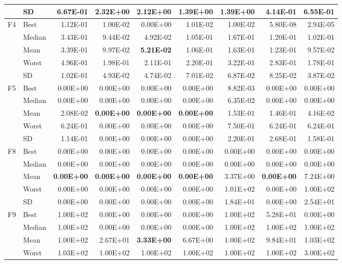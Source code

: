 \documentclass[algorithms,article,submit,moreauthors,pdftex]{Definitions/mdpi}
\newcommand{\bestval}[1]{\textbf{#1}}
\begin{document}
\begin{table}[p]
{\begin{tabular}{llrrrrrrr}
 & SD & 6.67E-01 & 2.32E+00 & 2.12E+00 & 1.39E+00 & 1.39E+00 & 4.14E-01 & 6.55E-01 \\
\midrule
F4 & Best & 1.12E-01 & 1.00E-02 & 0.00E+00 & 1.01E-02 & 1.00E-02 & 5.80E-08 & 2.94E-05 \\
 & Median & 3.43E-01 & 9.44E-02 & 4.92E-02 & 1.05E-01 & 1.67E-01 & 1.20E-01 & 1.02E-01 \\
 & Mean & 3.39E-01 & 9.97E-02 & \bestval{5.21E-02} & 1.06E-01 & 1.63E-01 & 1.23E-01 & 9.57E-02 \\
 & Worst & 4.96E-01 & 1.98E-01 & 2.11E-01 & 2.20E-01 & 3.22E-01 & 2.83E-01 & 1.78E-01 \\
 & SD & 1.02E-01 & 4.93E-02 & 4.74E-02 & 7.01E-02 & 6.87E-02 & 8.25E-02 & 3.87E-02 \\
\midrule
F5 & Best & 0.00E+00 & 0.00E+00 & 0.00E+00 & 0.00E+00 & 8.82E-03 & 0.00E+00 & 0.00E+00 \\
 & Median & 0.00E+00 & 0.00E+00 & 0.00E+00 & 0.00E+00 & 6.35E-02 & 0.00E+00 & 0.00E+00 \\
 & Mean & 2.08E-02 & \bestval{0.00E+00} & \bestval{0.00E+00} & \bestval{0.00E+00} & 1.53E-01 & 1.46E-01 & 4.16E-02 \\
 & Worst & 6.24E-01 & 0.00E+00 & 0.00E+00 & 0.00E+00 & 7.50E-01 & 6.24E-01 & 6.24E-01 \\
 & SD & 1.14E-01 & 0.00E+00 & 0.00E+00 & 0.00E+00 & 2.20E-01 & 2.68E-01 & 1.58E-01 \\
\midrule
F8 & Best & 0.00E+00 & 0.00E+00 & 0.00E+00 & 0.00E+00 & 0.00E+00 & 0.00E+00 & 0.00E+00 \\
 & Median & 0.00E+00 & 0.00E+00 & 0.00E+00 & 0.00E+00 & 0.00E+00 & 0.00E+00 & 0.00E+00 \\
 & Mean & \bestval{0.00E+00} & \bestval{0.00E+00} & \bestval{0.00E+00} & \bestval{0.00E+00} & 3.37E+00 & \bestval{0.00E+00} & 7.24E+00 \\
 & Worst & 0.00E+00 & 0.00E+00 & 0.00E+00 & 0.00E+00 & 1.01E+02 & 0.00E+00 & 1.00E+02 \\
 & SD & 0.00E+00 & 0.00E+00 & 0.00E+00 & 0.00E+00 & 1.84E+01 & 0.00E+00 & 2.54E+01 \\
\midrule
F9 & Best & 1.00E+02 & 0.00E+00 & 0.00E+00 & 0.00E+00 & 1.00E+02 & 5.28E+01 & 0.00E+00 \\
 & Median & 1.00E+02 & 0.00E+00 & 0.00E+00 & 0.00E+00 & 1.00E+02 & 1.00E+02 & 1.00E+02 \\
 & Mean & 1.00E+02 & 2.67E+01 & \bestval{3.33E+00} & 6.67E+00 & 1.00E+02 & 9.84E+01 & 1.03E+02 \\
 & Worst & 1.03E+02 & 1.00E+02 & 1.00E+02 & 1.00E+02 & 1.00E+02 & 1.00E+02 & 3.00E+02 \\

\end{tabular}}
\end{table}
\end{document}
